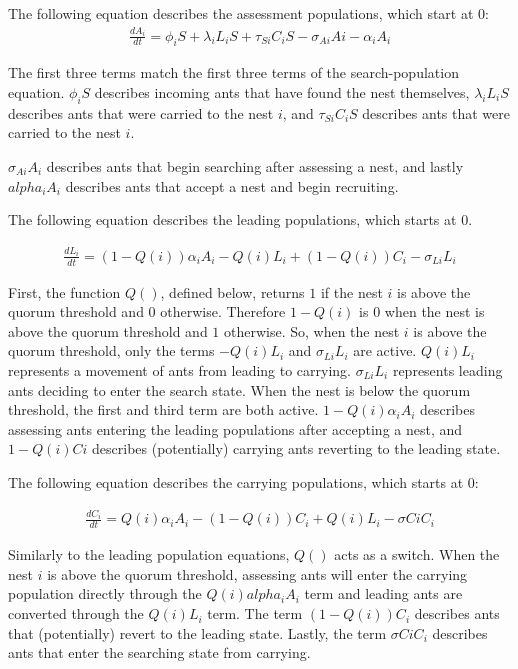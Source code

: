 \documentclass[letterpaper]{article}
\begin{document}
The following equation describes the assessment populations, which start at $0$:
\begin{multline}
    \frac{dA_i}{dt} = \phi_iS + \lambda_iL_iS + \tau_{Si}C_iS - \sigma_{Ai}Ai - \alpha_iA_i
\end{multline}

The first three terms match the first three terms of the search-population equation.
$\phi_iS$ describes incoming ants that have found the nest themselves, $\lambda_iL_iS$ describes ants that were carried to the nest $i$, and $\tau_{Si}C_iS$ describes ants that were carried to the nest $i$.

$\sigma_{Ai}A_i$ describes ants that begin searching after assessing a nest, and lastly $alpha_iA_i$ describes ants that accept a nest and begin recruiting.

The following equation describes the leading populations, which starts at $0$.

\begin{multline}
    \frac{dL_i}{dt} = (1-Q(i))\alpha_iA_i - Q(i)L_i + (1 - Q(i))C_i - \sigma_{Li}L_i
\end{multline}

First, the function $Q()$, defined below, returns $1$ if the nest $i$ is above the quorum threshold and $0$ otherwise. Therefore $1 - Q(i)$ is $0$ when the nest is above the quorum threshold and $1$ otherwise.
So, when the nest $i$ is above the quorum threshold, only the terms $-Q(i)L_i$ and $\sigma_{Li}L_i$ are active. $Q(i)L_i$ represents a movement of ants from leading to carrying. $\sigma_{Li}L_i$ represents leading ants deciding to enter the search state.
When the nest is below the quorum threshold, the first and third term are both active. $1-Q(i)\alpha_iA_i$ describes assessing ants entering the leading populations after accepting a nest, and $1-Q(i)Ci$ describes (potentially) carrying ants reverting to the leading state.

The following equation describes the carrying populations, which starts at $0$:

\begin{multline}
    \frac{dC_i}{dt} = Q(i)\alpha_iA_i - (1 - Q(i))C_i + Q(i)L_i - \sigma{Ci}C_i
\end{multline}

Similarly to the leading population equations, $Q()$ acts as a switch. When the nest $i$ is above the quorum threshold, assessing ants will enter the carrying population directly through the $Q(i)alpha_iA_i$ term and leading ants are converted through the $Q(i)L_i$ term.
The term $(1-Q(i))C_i$ describes ants that (potentially) revert to the leading state. 
Lastly, the term $\sigma{Ci}C_i$ describes ants that enter the searching state from carrying.
\end{document}
